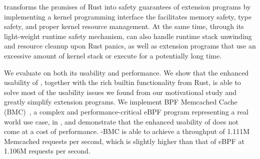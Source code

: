 \projname{} transforms the promises of Rust into safety guarantees of
    extension programs by implementing a kernel programming interface the
    facilitates memory safety, type safety, and proper kernel resource
    management.
At the same time, through its light-weight runtime safety mechanism,
    \projname{} can also handle runtime stack unwinding and resource cleanup
    upon Rust panics, as well as extension programs that use an excessive
    amount of kernel stack or execute for a potentially long time.


We evaluate \projname{} on both its usability and performance.
We show that the enhanced usability of \projname{}, together with the rich
    builtin functionality from Rust, is able to solve most of the usability
    issues we found from our motivational study and greatly simplify extension
    programs.
We implement BPF Memcached Cache (BMC)~\cite{BMC}, a complex and
    performance-critical eBPF program representing a real world use case, in
    \projname{}, and demonstrate that the enhanced usability of \projname{}
    does not come at a cost of performance.
\projname{}-BMC is able to achieve a throughput of 1.111M Memcached requests
    per second, which is slightly higher than that of eBPF at 1.106M requests
    per second.

